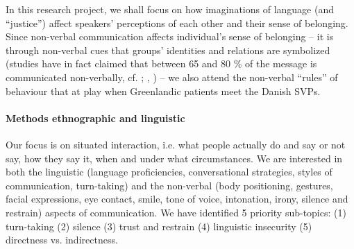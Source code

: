 \documentclass[twocolumn, serif, rga, authordate]{jote-article}
\begin{document}
In this research project, we shall focus on how imaginations of language
(and ``justice'') affect speakers' perceptions of each other and their sense of belonging. Since non-verbal communication affects individual's sense of belonging -- it is through non-verbal cues that groups'
identities and relations are symbolized (studies have in fact claimed that between 65 and 80 \% of the message is communicated non-verbally, cf.  \citeyear{Hall1959}; , \citeyear{ting-toomey2011}) -- we also attend the non-verbal
``rules'' of behaviour that at play when Greenlandic patients meet the Danish SVPs.


\paragraph{Methods ethnographic and linguistic}


Our focus is on situated interaction, i.e. what people actually do and say or not say, how they say it, when and under what circumstances. We are interested in both the linguistic (language proficiencies, conversational strategies, styles of communication, turn-taking) and the non-verbal (body positioning, gestures, facial expressions, eye contact, smile, tone of voice, intonation, irony, silence and restrain) aspects of communication. We have identified 5 priority sub-topics: (1) turn-taking (2) silence (3) trust and restrain
(4) linguistic insecurity (5) directness vs. indirectness.
\end{document}
